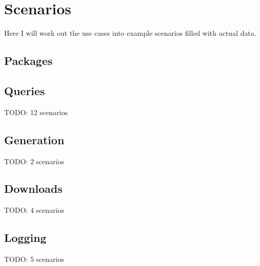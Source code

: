 \newpage
\section{Scenarios}  
Here I will work out the use cases into example scenarios filled with actual
data.


\subsection{Packages}









\subsection{Queries}
TODO: 12 scenarios
%
%
%
%
%
%
%
%
%
%
%
%


\subsection{Generation}
TODO: 2 scenarios
%
%


\subsection{Downloads}
TODO: 4 scenarios
%
%
%
%


\subsection{Logging}
TODO: 5 scenarios
%
%
%
%
%


